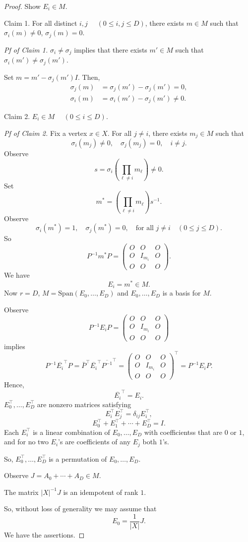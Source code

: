 \documentclass[
]{book}
\theoremstyle{definition}
\theoremstyle{definition}
\theoremstyle{definition}
\theoremstyle{definition}
\theoremstyle{remark}
\begin{document}
\begin{proof}
Show \(E_i\in M\).

Claim 1. For all distinct \(i, j\) \(\quad (0\leq i, j\leq D)\), there exists \(m\in M\) such that \(\sigma_i(m)\neq 0\), \(\sigma_j(m)=0\).

\emph{Pf of Claim 1.}
\(\sigma_i\neq \sigma_j\) implies that there exists \(m'\in M\) such that \(\sigma_i(m')\neq \sigma_j(m')\).

Set \(m = m'-\sigma_j(m')I\). Then,
\begin{align}
\sigma_j(m) & = \sigma_j(m') - \sigma_j(m')  = 0,\\
\sigma_i(m) & = \sigma_i(m') - \sigma_j(m')  \neq 0.
\end{align}

Claim 2. \(E_i\in M\) \(\quad (0\leq i \leq D)\).

\emph{Pf of Claim 2.}
Fix a vertex \(x\in X\). For all \(j\neq i\), there exists \(m_j\in M\) such that
\[\sigma_i(m_j)\neq 0, \quad \sigma_j(m_j) = 0, \quad i\neq j.\]
Observe
\[s = \sigma_i\left(\prod_{\ell\neq i}m_\ell\right) \neq 0.\]
Set
\[m^* = \left(\prod_{\ell\neq i}m_\ell\right) s^{-1}.\]
Observe
\[\sigma_i(m^*) =1, \quad \sigma_j(m^*) = 0, \quad \text{for all }j\neq i \quad (0\leq j\leq D).\]
So
\[P^{-1}m^*P = \begin{pmatrix} O & O & O\\
O & I_{m_i} & O\\
O & O & O \end{pmatrix}.\]
We have
\[E_i = m^*\in M.\]
Now \(r = D\), \(M = \mathrm{Span}(E_0, \ldots, E_D)\) and \(E_0, \ldots, E_D\) is a basis for \(M\).

Observe
\[P^{-1}E_iP = \begin{pmatrix} O & O & O\\
O & I_{m_i} & O\\
O & O & O \end{pmatrix}\]
implies
\[P^{-1}\overline{E_i}^\top P = \bar{P}^\top \overline{E_i}^\top \overline{P^{-1}}^\top = \begin{pmatrix} O & O & O\\
O & I_{m_i} & O\\
O & O & O \end{pmatrix}^\top = P^{-1}E_i P.\]
Hence,
\[\overline{E_i}^\top = E_i.\]
\(E_0^\top, \ldots, E_D^\top\) are nonzero matrices satisfying
\[E_i^\top E_j^\top = \delta_{ij}E_i^\top,\]
\[E_0^\top + E_1^\top + \cdots + E_D^\top = I.\]
Each \(E_i^\top\) is a linear combination of \(E_0, \ldots, E_D\) with coefficientss that are \(0\) or \(1\), and for no two \(E_i\)'s are coefficients of any \(E_j\) both \(1\)'s.

So, \(E_0^\top, \ldots, E_D^\top\) is a permutation of \(E_0, \ldots, E_D\).

Observe \(J = A_0 + \cdots + A_D\in M\).

The matrix \(|X|^{-1}J\) is an idempotent of rank \(1\).

So, without loss of generality we may assume that
\[E_0 = \frac{1}{|X|}J.\]
We have the assertions.
\end{proof}
\end{document}
